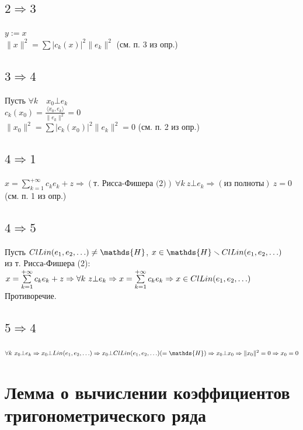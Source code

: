 \documentclass[paper=a4, fontsize=17pt]{article}
\begin{document}
\subsection{\texorpdfstring{$2 \Rightarrow 3$}{TEXT}}
$y:=x$\\
$\|x\|^2=\sum \vert c_k(x) \vert ^2 \|e_k\|^2$ (см. п. 3 из опр.)

\subsection{\texorpdfstring{$3 \Rightarrow 4$}{TEXT}}
Пусть $\forall k \quad x_0 \bot e_k$\\
$c_k(x_0)=\frac{\langle x_0, e_k \rangle}{\|e_k\|^2}=0$\\
$\|x_0\|^2=\sum \vert c_k(x_0) \vert^2 \|e_k\|^2 = 0$ (см. п. 2 из опр.)

\subsection{\texorpdfstring{$4 \Rightarrow 1$}{TEXT}}
$x =\sum\limits_{k=1}^{+\infty} c_k e_k + z \Rightarrow(\text{т. Рисса-Фишера (2)}) \  \forall k \ z \bot e_k \Rightarrow(\text{из полноты}) \ z = 0$ (см. п. 1 из опр.) 

\subsection{\texorpdfstring{$4 \Rightarrow 5$}{TEXT}}
Пусть $Cl Lin(e_1, e_2, \mathellipsis) \ne \mathds{H}$, $x \in \mathds{H} \smallsetminus Cl Lin(e_1, e_2, \mathellipsis)$\\
из т. Рисса-Фишера (2): $x =\sum\limits_{k=1}^{+\infty} c_k e_k + z \Rightarrow \forall k \ z \bot e_k \Rightarrow x =\sum\limits_{k=1}^{+\infty} c_k e_k \Rightarrow x \in Cl Lin(e_1, e_2, \mathellipsis)$\\
Противоречие.

\subsection{\texorpdfstring{$5 \Rightarrow 4$}{TEXT}}
$\forall k \ x_0 \bot e_k \Rightarrow x_0 \bot Lin(e_1, e_2, \mathellipsis) \Rightarrow x_0 \bot Cl Lin(e_1, e_2, \mathellipsis)( = \mathds{H}) \Rightarrow x_0 \bot x_0 \Rightarrow \|x_0\|^2 = 0 \Rightarrow x_0 = 0$

\section{Лемма о вычислении коэффициентов тригонометрического ряда}
\end{document}
